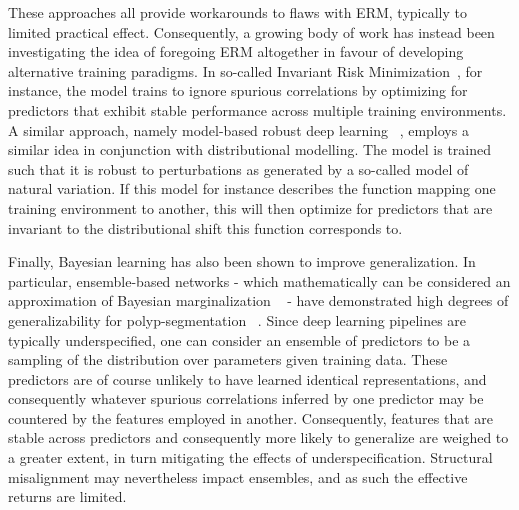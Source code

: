 These approaches all provide workarounds to flaws with ERM, typically to limited practical effect. Consequently, a growing body of work has instead been investigating the idea of foregoing ERM altogether in favour of developing alternative training paradigms. In so-called Invariant Risk Minimization~\cite{IRM}, for instance, the model trains to ignore spurious correlations by optimizing for predictors that exhibit stable performance across multiple training environments. A similar approach, namely model-based robust deep learning ~\cite{modelbased}, employs a similar idea in conjunction with distributional modelling. The model is trained such that it is robust to perturbations as generated by a so-called model of natural variation. If this model for instance describes the function mapping one training environment to another, this will then optimize for predictors that are invariant to the distributional shift this function corresponds to. 

Finally, Bayesian learning has also been shown to improve generalization. In particular, ensemble-based networks - which mathematically can be considered an approximation of Bayesian marginalization ~\cite{bayesian_case,bayesian_generalization} - have demonstrated high degrees of generalizability for polyp-segmentation ~\cite{divergentnets,endoensemble}. Since deep learning pipelines are typically underspecified, one can consider an ensemble of predictors to be a sampling of the distribution over parameters given training data. These predictors are of course unlikely to have learned identical representations, and consequently whatever spurious correlations inferred by one predictor may be countered by the features employed in another. Consequently, features that are stable across predictors and consequently more likely to generalize are weighed to a greater extent, in turn mitigating the effects of underspecification. Structural misalignment may nevertheless impact ensembles, and as such the effective returns are limited. 

